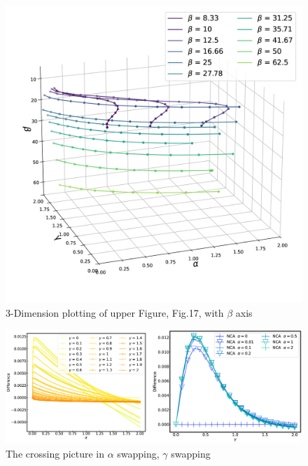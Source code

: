 \documentclass{article}[12pt]
\begin{document}
\begin{spacing}{1.5}
\begin{figure}[htbp]
\end{figure}
\begin{figure}[htbp]
  \centerline{\includegraphics[width=14cm]{TexFigure/3dplot_Ns3_proj_n (0).png}}
  \caption{3-Dimension plotting of upper Figure, Fig.17,  with $\beta$ axis}
\end{figure}
\begin{figure}[htbp]
  \centerline{\includegraphics[width=15cm]{TexFigure/swap_fig.png}}
  \caption{The crossing picture in $\alpha$ swapping, $\gamma$ swapping}
\end{figure}
\pagebreak

\end{spacing}
\end{document}
